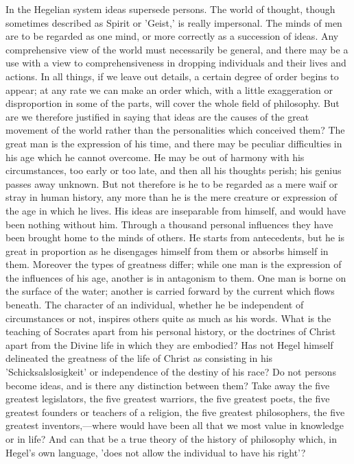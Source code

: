 \documentclass[11pt,letter]{article}
\begin{document}
\par  In the Hegelian system ideas supersede persons. The world of thought, though sometimes described as Spirit or 'Geist,' is really impersonal. The minds of men are to be regarded as one mind, or more correctly as a succession of ideas. Any comprehensive view of the world must necessarily be general, and there may be a use with a view to comprehensiveness in dropping individuals and their lives and actions. In all things, if we leave out details, a certain degree of order begins to appear; at any rate we can make an order which, with a little exaggeration or disproportion in some of the parts, will cover the whole field of philosophy. But are we therefore justified in saying that ideas are the causes of the great movement of the world rather than the personalities which conceived them? The great man is the expression of his time, and there may be peculiar difficulties in his age which he cannot overcome. He may be out of harmony with his circumstances, too early or too late, and then all his thoughts perish; his genius passes away unknown. But not therefore is he to be regarded as a mere waif or stray in human history, any more than he is the mere creature or expression of the age in which he lives. His ideas are inseparable from himself, and would have been nothing without him. Through a thousand personal influences they have been brought home to the minds of others. He starts from antecedents, but he is great in proportion as he disengages himself from them or absorbs himself in them. Moreover the types of greatness differ; while one man is the expression of the influences of his age, another is in antagonism to them. One man is borne on the surface of the water; another is carried forward by the current which flows beneath. The character of an individual, whether he be independent of circumstances or not, inspires others quite as much as his words. What is the teaching of Socrates apart from his personal history, or the doctrines of Christ apart from the Divine life in which they are embodied? Has not Hegel himself delineated the greatness of the life of Christ as consisting in his 'Schicksalslosigkeit' or independence of the destiny of his race? Do not persons become ideas, and is there any distinction between them? Take away the five greatest legislators, the five greatest warriors, the five greatest poets, the five greatest founders or teachers of a religion, the five greatest philosophers, the five greatest inventors,—where would have been all that we most value in knowledge or in life? And can that be a true theory of the history of philosophy which, in Hegel's own language, 'does not allow the individual to have his right'?
\end{document}
